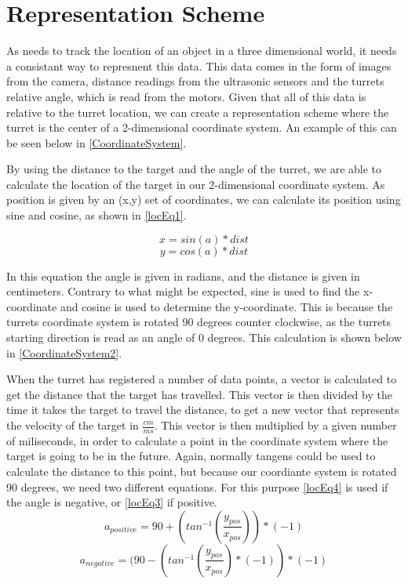 \section{Representation Scheme}\label{RepScheme}
As \name needs to track the location of an object in a three dimensional world,
it needs a consistant way to represnent this data. This data comes in the form
of images from the camera, distance readings from the ultrasonic sensors and
the turrets relative angle, which is read from the motors. Given that all of
this data is relative to the turret location, we can create a representation
scheme where the turret is the center of a 2-dimensional coordinate system. An
example of this can be seen below in \autoref{CoordinateSystem}.\nl


By using the distance to the target and the angle of the turret, we are able to
calculate the location of the target in our 2-dimensional coordinate system.
As position is given by an (x,y) set of coordinates, we can calculate its
position using sine and cosine, as shown in \autoref{locEq1}.

\begin{equation}\label{locEq1}
x=sin(a)*dist
\end{equation}
\begin{equation}\label{locEq2}
y=cos(a)*dist
\end{equation} 

In this equation the angle  is given in radians, and the distance
 is given in centimeters. Contrary to what might be expected, sine
is used to find the x-coordinate and cosine is used to determine the
y-coordinate. This is because the turrets coordinate system is rotated 90
degrees counter clockwise, as the turrets starting direction is read as an angle
of 0 degrees. This calculation is shown below in \autoref{CoordinateSystem2}.


When the turret has registered a number of data points, a vector is
calculated to get the distance that the target has travelled. This vector is
then divided by the time it takes the target to travel the distance, to get a
new vector that represents the velocity of the target in $\frac{cm}{ms}$. This
vector is then multiplied by a given number of miliseconds, in order to
calculate a point in the coordinate system where the target is going to be in
the future. Again, normally tangens could be used to calculate the distance to
this point, but because our coordiante system is rotated 90 degrees, we need two
different equations. For this purpose \autoref{locEq4} is used if the angle is
negative, or \autoref{locEq3} if positive.
\begin{equation}\label{locEq3}
a_{positive}=90+(tan^{-1}(\frac{y_{pos}}{x_{pos}}))*(-1)
\end{equation} 
\begin{equation}\label{locEq4}
a_{negative}=(90-(tan^{-1}(\frac{y_{pos}}{x_{pos}})*(-1))*(-1)
\end{equation} 

